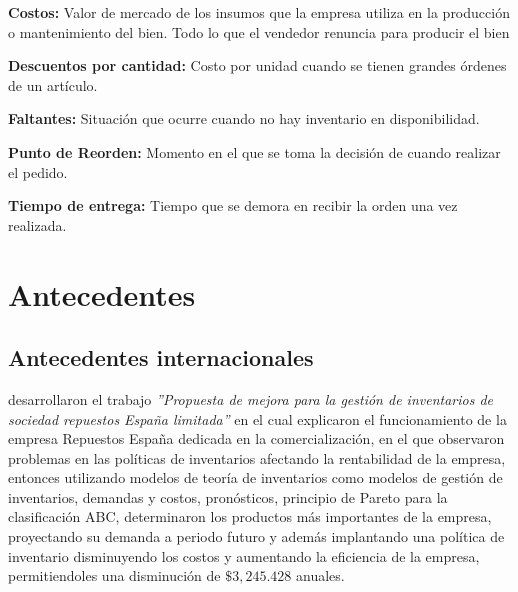 \noindent
\textbf{Costos:} Valor de mercado de los insumos que la empresa utiliza en la producción o mantenimiento del bien. Todo lo que el vendedor renuncia para producir el bien \citep{mankiw2007principios}\vspace{0.25cm}

\noindent
\textbf{Descuentos por cantidad:} Costo por unidad cuando se tienen grandes órdenes de un artículo. \citep{render2006metodos}\vspace{0.25cm}

\noindent
\textbf{Faltantes:} Situación que ocurre cuando no hay inventario en disponibilidad. \citep{render2006metodos}\vspace{0.25cm}

\noindent
\textbf{Punto de Reorden:} Momento en el que se toma la decisión de cuando realizar el pedido. \citep{taha2012investigacion}\vspace{0.25cm}

\noindent
\textbf{Tiempo de entrega:} Tiempo que se demora en recibir la orden una vez realizada. \citep{render2006metodos}

\section{Antecedentes}
\subsection{Antecedentes internacionales}

\cite{gallardo2016propuesta} desarrollaron el trabajo \textsl{''Propuesta de mejora para la gestión de inventarios de sociedad repuestos España limitada''} en el cual explicaron el funcionamiento de la empresa Repuestos España dedicada en la comercialización, en el que observaron problemas en las políticas de inventarios afectando la rentabilidad de la empresa, entonces utilizando modelos de teoría de inventarios como modelos de gestión de inventarios, demandas y costos, pronósticos, principio de Pareto para la clasificación ABC, determinaron los productos más importantes de la empresa, proyectando su demanda a periodo futuro y además implantando una política de inventario disminuyendo los costos y aumentando la eficiencia de la empresa, permitiendoles una disminución de $\$3,245$.$428$ anuales.

